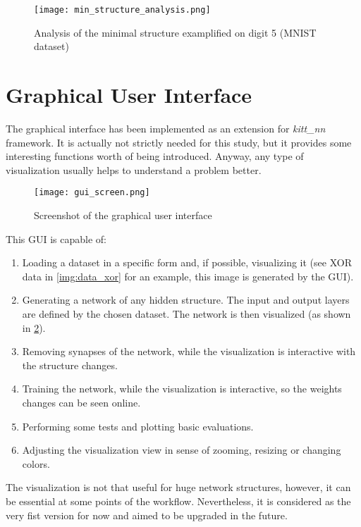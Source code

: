 \begin{figure}[H]
  \centering
  \texttt{[image: min\_structure\_analysis.png]}
  \caption{Analysis of the minimal structure examplified on digit 5 (MNIST dataset)}
  \label{img:structure_util}
\end{figure}

\section{Graphical User Interface} \label{sec:gui}
The graphical interface has been implemented as an extension for \textit{kitt\_nn} framework. It is actually not strictly needed for this study, but it provides some interesting functions worth of being introduced. Anyway, any type of visualization usually helps to understand a problem better.

\begin{figure}[H]
  \centering
  \texttt{[image: gui\_screen.png]}
  \caption{Screenshot of the graphical user interface}
  \label{img:gui_screen}
\end{figure}

This GUI is capable of:
\begin{enumerate}
\item Loading a dataset in a specific form and, if possible, visualizing it (see XOR data in \cref{img:data_xor} for an example, this image is generated by the GUI).
\item Generating a network of any hidden structure. The input and output layers are defined by the chosen dataset. The network is then visualized (as shown in \cref{img:gui_screen}).
\item Removing synapses of the network, while the visualization is interactive with the structure changes.
\item Training the network, while the visualization is interactive, so the weights changes can be seen online.
\item Performing some tests and plotting basic evaluations.
\item Adjusting the visualization view in sense of zooming, resizing or changing colors.
\end{enumerate}

The visualization is not that useful for huge network structures, however, it can be essential at some points of the workflow. Nevertheless, it is considered as the very fist version for now and aimed to be upgraded in the future.